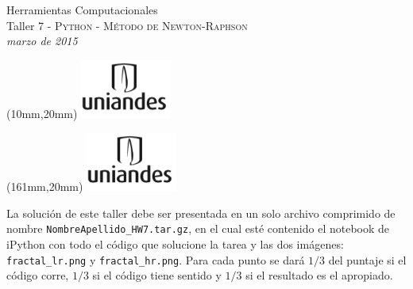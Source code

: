 \documentclass[11pt,letterpaper]{exam}
\begin{document}
\begin{center}
{\Large Herramientas Computacionales} \\
Taller 7 - \textsc{Python - Método de Newton-Raphson} \\
{\small \it marzo de 2015}
\end{center}

\begin{textblock*}{40mm}(10mm,20mm)
  \includegraphics[width=3cm]{logoUniandes.png}
\end{textblock*}

\begin{textblock*}{40mm}(161mm,20mm)
  \includegraphics[width=3cm]{logoUniandes.png}
\end{textblock*}

\vspace{1cm}

La solución de este taller debe ser presentada en un solo archivo comprimido de nombre \verb+NombreApellido_HW7.tar.gz+, en el cual esté contenido el notebook de iPython con todo el código que solucione la tarea y las dos imágenes: \verb|fractal_lr.png| y \verb|fractal_hr.png|. Para cada punto se dará $1/3$ del puntaje si el código corre, $1/3$ si el código tiene sentido y $1/3$ si el resultado es el apropiado.
\end{document}

